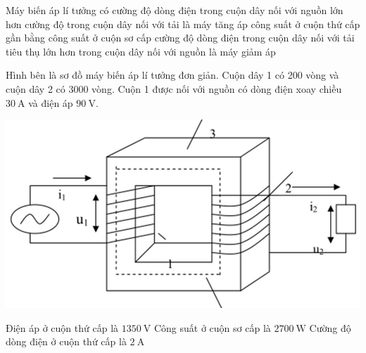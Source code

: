 \begin{ex}
	Máy biến áp lí tưởng có
	{\True cường độ dòng điện trong cuộn dây nối với nguồn lớn hơn cường độ trong cuộn dây nối với tải là máy tăng áp}
	{\True công suất ở cuộn thứ cấp gần bằng công suất ở cuộn sơ cấp}
	{\True cường độ dòng điện trong cuộn dây nối với tải tiêu thụ lớn hơn trong cuộn dây nối với nguồn là máy giảm áp}
\end{ex}
\begin{ex}
	Hình bên là sơ đồ máy biến áp lí tưởng đơn giản. Cuộn dây 1 có 200 vòng và cuộn dây 2 có 3000 vòng. Cuộn 1 được nối với nguồn có dòng điện xoay chiều $\SI{30}{\ampere}$ và điện áp $\SI{90}{\volt}$.
	\begin{center}
		\includegraphics[width=0.4\linewidth]{figs/VN12-Y24-PH-SYL-024P-2}
	\end{center}
	{\True Điện áp ở cuộn thứ cấp là $\SI{1350}{\volt}$}
	{\True Công suất ở cuộn sơ cấp là $\SI{2700}{\watt}$}
	{\True Cường độ dòng điện ở cuộn thứ cấp là $\SI{2}{\ampere}$}
\end{ex}
